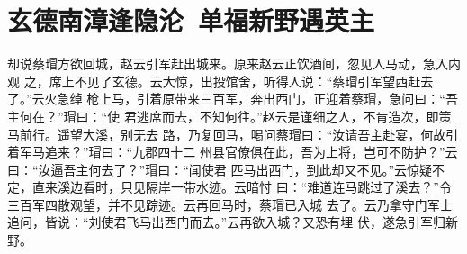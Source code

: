 \chapter{玄德南漳逢隐沦~单福新野遇英主}

却说蔡瑁方欲回城，赵云引军赶出城来。原来赵云正饮酒间，忽见人马动，急入内观
之，席上不见了玄德。云大惊，出投馆舍，听得人说：“蔡瑁引军望西赶去了。”云火急绰
枪上马，引着原带来三百军，奔出西门，正迎着蔡瑁，急问曰：“吾主何在？”瑁曰：“使
君逃席而去，不知何往。”赵云是谨细之人，不肯造次，即策马前行。遥望大溪，别无去
路，乃复回马，喝问蔡瑁曰：“汝请吾主赴宴，何故引着军马追来？”瑁曰：“九郡四十二
州县官僚俱在此，吾为上将，岂可不防护？”云曰：“汝逼吾主何去了？”瑁曰：“闻使君
匹马出西门，到此却又不见。”云惊疑不定，直来溪边看时，只见隔岸一带水迹。云暗忖
曰：“难道连马跳过了溪去？”令三百军四散观望，并不见踪迹。云再回马时，蔡瑁已入城
去了。云乃拿守门军士追问，皆说：“刘使君飞马出西门而去。”云再欲入城？又恐有埋
伏，遂急引军归新野。

